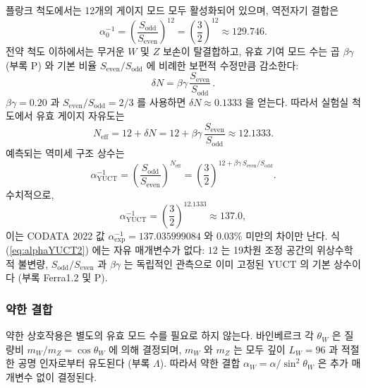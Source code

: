 \documentclass[12pt,a4paper]{article}
\begin{document}
	플랑크 척도에서는 12개의 게이지 모드 모두 활성화되어 있으며, 역전자기 결합은
	\begin{equation}
		\alpha_0^{-1} = \left(\frac{S_{\mathrm{odd}}}{S_{\mathrm{even}}}\right)^{\!12}
		= \left(\frac{3}{2}\right)^{\!12} \approx 129.746 .
	\end{equation}
	전약 척도 이하에서는 무거운 \(W\) 및 \(Z\) 보손이 탈결합하고, 유효 기여 모드 수는 곱 \(\beta\gamma\) (부록 P) 와 기본 비율 \(S_{\mathrm{even}}/S_{\mathrm{odd}}\) 에 비례한 보편적 수정만큼 감소한다:
	\begin{equation}
		\delta N = \beta\gamma\,\frac{S_{\mathrm{even}}}{S_{\mathrm{odd}}}\, .
		\label{eq:deltaN2}
	\end{equation}
	\(\beta\gamma = 0.20\) 과 \(S_{\mathrm{even}}/S_{\mathrm{odd}} = 2/3\) 를 사용하면 \(\delta N \approx 0.1333\) 을 얻는다. 따라서 실험실 척도에서 유효 게이지 자유도는
	\begin{equation}
		N_{\mathrm{eff}} = 12 + \delta N = 12 + \beta\gamma\,\frac{S_{\mathrm{even}}}{S_{\mathrm{odd}}}
		\approx 12.1333 .
	\end{equation}
	예측되는 역미세 구조 상수는
	\begin{equation}
		\boxed{\alpha^{-1}_{\mathrm{YUCT}} =
			\left(\frac{S_{\mathrm{odd}}}{S_{\mathrm{even}}}\right)^{\!N_{\mathrm{eff}}}
			= \left(\frac{3}{2}\right)^{\!12 + \beta\gamma\,S_{\mathrm{even}}/S_{\mathrm{odd}}} } .
		\label{eq:alphaYUCT2}
	\end{equation}
	수치적으로,
	\[
	\alpha^{-1}_{\mathrm{YUCT}} = \left(\frac{3}{2}\right)^{\!12.1333} \approx 137.0 ,
	\]
	이는 CODATA 2022 값 \(\alpha^{-1}_{\mathrm{exp}} = 137.035999084\) 와 \(0.03\%\) 미만의 차이만 난다. 식 (\ref{eq:alphaYUCT2}) 에는 자유 매개변수가 없다: \(12\) 는 19차원 조정 공간의 위상수학적 불변량, \(S_{\mathrm{odd}}/S_{\mathrm{even}}\) 과 \(\beta\gamma\) 는 독립적인 관측으로 이미 고정된 YUCT 의 기본 상수이다 (부록 Ferra1.2 및 P).
	
	\subsubsection{약한 결합}
	약한 상호작용은 별도의 유효 모드 수를 필요로 하지 않는다. 바인베르크 각 \(\theta_W\) 은 질량비 \(m_W/m_Z = \cos\theta_W\) 에 의해 결정되며, \(m_W\) 와 \(m_Z\) 는 모두 깊이 \(L_W = 96\) 과 적절한 공명 인자로부터 유도된다 (부록 \(\Lambda\)). 따라서 약한 결합 \(\alpha_W = \alpha/\sin^2\theta_W\) 은 추가 매개변수 없이 결정된다.
	
\end{document}
